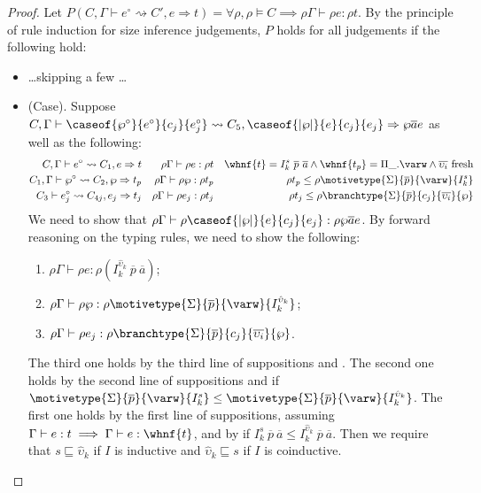 \begin{proof}
Let $P(C, \Gamma \vdash e^\circ \rightsquigarrow C', e \Rightarrow t) = \forall \rho, \rho \vDash C \implies \rho \Gamma \vdash \rho e : \rho t$. By the principle of rule induction for size inference judgements, $P$ holds for all judgements if the following hold:
\begin{itemize}
    \item \ldots skipping a few \ldots
    \item (Case). Suppose $C, \Gamma \vdash \caseof{\wp^\circ}{e^\circ}{c_j}{e_j^\circ} \rightsquigarrow C_5, \caseof{|\wp|}{e}{c_j}{e_j} \Rightarrow \wp \overline{a} e$ as well as the following:
    \begin{align*}
        C, \Gamma \vdash e^\circ \rightsquigarrow C_1, e \Rightarrow t && \rho \Gamma \vdash \rho e : \rho t && \whnf{t} = I_k^s\ \overline{p}\ \overline{a} \wedge \whnf{t_p} = \Pi \_. \varw \wedge \overline{\upsilon_i}\ \text{fresh}\\
        C_1, \Gamma \vdash \wp^\circ \rightsquigarrow C_2, \wp \Rightarrow t_p && \rho \Gamma \vdash \rho \wp : \rho t_p && \rho t_p \leq \rho \motivetype{\Sigma}{\overline{p}}{\varw}{I_k^s} \\
        C_3 \vdash e_j^\circ \rightsquigarrow C_{4j}, e_j \Rightarrow t_j && \rho \Gamma \vdash \rho e_j : \rho t_j && \rho t_j \leq \rho \branchtype{\Sigma}{\overline{p}}{c_j}{\overline{\upsilon_i}}{\wp}
    \end{align*}
    We need to show that $\rho \Gamma \vdash \rho \caseof{|\wp|}{e}{c_j}{e_j} : \rho \wp \overline{a} e$. By forward reasoning on the typing rules, we need to show the following:
    \begin{enumerate}
        \item $\rho \Gamma \vdash \rho e : \rho (I_k^{\hat{\upsilon}_k}\ \overline{p}\ \overline{a})$;
        \item $\rho \Gamma \vdash \rho \wp : \rho \motivetype{\Sigma}{\overline{p}}{\varw}{I_k^{\hat{\upsilon}_k}}$;
        \item $\rho \Gamma \vdash \rho e_j : \rho \branchtype{\Sigma}{\overline{p}}{c_j}{\overline{\upsilon_i}}{\wp}$.
    \end{enumerate}
    The third one holds by the third line of suppositions and . The second one holds by the second line of suppositions and  if $\motivetype{\Sigma}{\overline{p}}{\varw}{I_k^s} \leq \motivetype{\Sigma}{\overline{p}}{\varw}{I_k^{\hat{\upsilon}_k}}$. The first one holds by the first line of suppositions, assuming $\Gamma \vdash e : t \implies \Gamma \vdash e : \whnf{t}$, and by  if $I_k^s\ \overline{p}\ \overline{a} \leq I_k^{\hat{\upsilon}_k}\ \overline{p}\ \overline{a}$. Then we require that $s \sqsubseteq \hat{\upsilon}_k$ if $I$ is inductive and $\hat{\upsilon}_k \sqsubseteq s$ if $I$ is coinductive.
\end{itemize}
\end{proof}